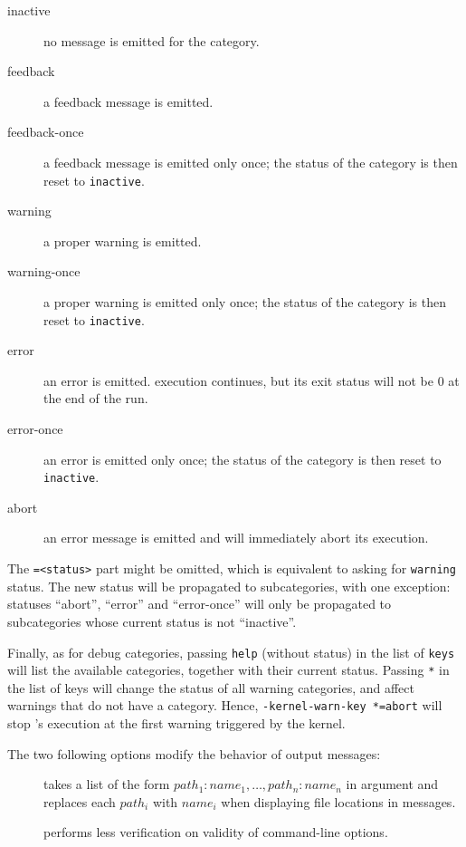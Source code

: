 \begin{description}
\begin{description}
\item[inactive] no message is emitted for the category.
\item[feedback] a feedback message is emitted.
\item[feedback-once] a feedback message is emitted only once;
  the status of the category is then reset to \texttt{inactive}.
\item[warning] a proper warning is emitted.
\item[warning-once] a proper warning is emitted only once;
  the status of the category is then reset to \texttt{inactive}.
\item[error] an error is emitted. \FramaC execution continues, but its
  exit status will not be 0 at the end of the run.
\item[error-once] an error is emitted only once;
  the status of the category is then reset to \texttt{inactive}.
\item[abort] an error message is emitted and \FramaC will immediately abort
 its execution.
\end{description}

The \texttt{=<status>} part might be omitted, which is equivalent to asking for \texttt{warning} status.
The new status will be propagated to subcategories, with one exception: statuses
``abort'', ``error'' and ``error-once'' will only be propagated to subcategories
whose current status is not ``inactive''.

Finally, as for debug categories, passing \texttt{help} (without status) in the list of
\texttt{keys} will list the available categories, together with their
current status. Passing \texttt{*} in the list of keys will change the status
of all warning categories, and affect warnings that do not have a category.
Hence, \texttt{-kernel-warn-key *=abort} will stop \FramaC's execution at the
first warning triggered by the kernel.
\end{description}

The two following options modify the behavior of output messages:
\begin{description}
\item[] takes a list of the form $path_1:name_1,
  \dots, path_n:name_n$ in argument and replaces each $path_i$ with $name_i$ when
  displaying file locations in messages.
\item[] performs less verification on validity of
  command-line options.
\end{description}


